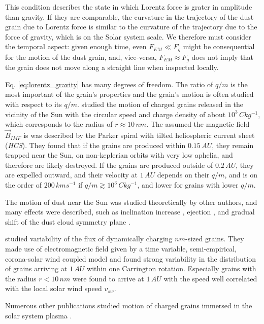 This condition describes the state in which Lorentz force is grater in amplitude than gravity. If they are comparable, the curvature in the trajectory of the dust grain due to Lorentz force is similar to the curvature of the trajectory due to the force of gravity, which is on the Solar system scale. We therefore must consider the temporal aspect: given enough time, even $F_{EM} \ll F_g$ might be consequential for the motion of the dust grain, and, vice-versa, $F_{EM} \approx F_g$ does not imply that the grain does not move along a straight line when inspected locally. 

Eq. \ref{eq:lorentz_gravity} has many degrees of freedom. The ratio of $q/m$ is the most important of the grain's properties and the grain's motion is often studied with respect to its $q/m$. \citet{czechowski2010formation} studied the motion of charged grains released in the vicinity of the Sun with the circular speed and charge density of about $10^3 \, \si{C kg^{-1}}$, which corresponds to the radius of $r \approx 10 \, \si{nm}$. The assumed the magnetic field $\vec{B}_{IMF}$ is was described by the Parker spiral \citep{parker1958dynamics} with tilted heliospheric current sheet (\textit{HCS}). They found that if the grains are produced within $0.15 \, \si{AU}$, they remain trapped near the Sun, on non-keplerian orbits with very low aphelia, and therefore are likely destroyed. If the grains are produced outside of $0.2 \, \si{AU}$, they are expelled outward, and their velocity at $1 \, \si{AU}$ depends on their $q/m$, and is on the order of $200 \, \si{km s^{-1}}$ if $q/m \gtrsim 10^3 \, \si{C kg^{-1}}$, and lower for grains with lower $q/m$. 

The motion of dust near the Sun was studied theoretically by other authors, and many effects were described, such as inclination increase \citep{krivov1998dynamics}, ejection \citep{krivov1998dynamics}, and gradual shift of the dust cloud symmetry plane \citep{morfill1979motion}.

\citet{poppe2020effects} studied variability of the flux of dynamically charging $\si{nm}$-sized grains. They made use of electromagnetic field given by a time variable, semi-empirical, corona-solar wind coupled model and found strong variability in the distribution of grains arriving at $1 \, \si{AU}$ within one Carrington rotation. Especially grains with the radius $r<10 \, \si{nm}$ were found to arrive at $1 \, \si{AU}$ with the speed well correlated with the local solar wind speed $v_{sw}$. 

Numerous other publications studied motion of charged grains immersed in the solar system plasma \citep{mann2007nanoparticles,horanyi1996charged,juhasz2013dynamics,stamm2019dust,czechowski2021dynamics,poppe2022effects,rusk1988effect}.

